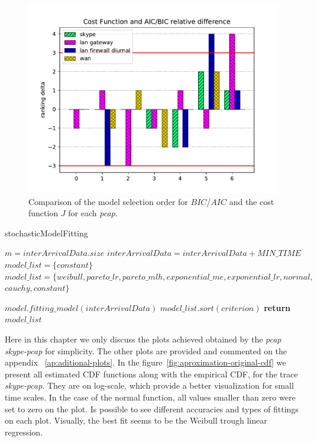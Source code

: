 \begin{figure}[ht!]
\includegraphics[scale=0.8]{figures/ch4/aicbic-costfunction-relative-diff}
\caption{Comparison of the model selection order for $BIC$/$AIC$ and the cost function $J$ for each \textit{pcap}.}
\label{fig:cost-function_vs_aic-bic}
\end{figure}



\begin{algorithm}[ht!]
    \caption{stochasticModelFitting}
    \label{alg:stochasticModelFitting}
    \begin{algorithmic}[1]
        \small        {}
        \State $m = interArrivalData.size$
        \State $interArrivalData = interArrivalData + MIN\_TIME$
        \State $model\_list = \{constant\}$
        \Else
        \State $model\_list = \{weibull, pareto\_lr, pareto\_mlh, exponential\_me, exponential\_lr, normal,$
        \State $cauchy, constant\}$
        \EndIf
        
        \State $model.fitting\_model(interArrivalData)$
        \EndFor
        \State $model\_list.sort(criterion)$
        \State \textbf{return} $model\_list$
        \EndFunction
    \end{algorithmic}
\end{algorithm}

Here in this chapter we only discuss the plots achieved obtained by the \textit{pcap} \textit{skype-pcap} for simplicity. The other plots are provided and commented on the appendix ~\ref{ap:aditional-plots}. In the figure~\ref{fig:aproximation-original-cdf} we present all estimated CDF functions along with the empirical CDF, for the trace \textit{skype-pcap}. They are on log-scale, which provide a better visualization for small time scales. In the case of the normal function, all values smaller than zero were set to zero on the plot. Is possible to see different accuracies and types of fittings on each plot. Visually, the best fit seems to be the Weibull trough linear regression. 


